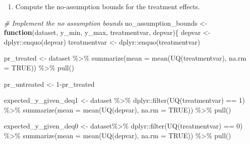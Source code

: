 \documentclass[
]{article}
\newenvironment{Shaded}{\begin{snugshade}}{\end{snugshade}}
\newcommand{\AttributeTok}[1]{\textcolor[rgb]{0.77,0.63,0.00}{#1}}
\newcommand{\CommentTok}[1]{\textcolor[rgb]{0.56,0.35,0.01}{\textit{#1}}}
\newcommand{\ConstantTok}[1]{\textcolor[rgb]{0.00,0.00,0.00}{#1}}
\newcommand{\ControlFlowTok}[1]{\textcolor[rgb]{0.13,0.29,0.53}{\textbf{#1}}}
\newcommand{\DecValTok}[1]{\textcolor[rgb]{0.00,0.00,0.81}{#1}}
\newcommand{\FunctionTok}[1]{\textcolor[rgb]{0.00,0.00,0.00}{#1}}
\newcommand{\NormalTok}[1]{#1}
\newcommand{\OtherTok}[1]{\textcolor[rgb]{0.56,0.35,0.01}{#1}}
\newcommand{\SpecialCharTok}[1]{\textcolor[rgb]{0.00,0.00,0.00}{#1}}
\providecommand{\tightlist}{%
  \setlength{\itemsep}{0pt}\setlength{\parskip}{0pt}}
\let\oldShaded\Shaded
\let\endoldShaded\endShaded
\renewenvironment{Shaded}{\footnotesize\oldShaded}{\endoldShaded}
\begin{document}
\clearpage

\begin{enumerate}
\def\labelenumi{\arabic{enumi}.}
\setcounter{enumi}{3}
\tightlist
\item
  Compute the no-assumption bounds for the treatment effects.
\end{enumerate}

\begin{Shaded}
\begin{Highlighting}[]
\CommentTok{\# Implement the no assumption bounds}
\NormalTok{no\_assumption\_bounds }\OtherTok{\textless{}{-}} \ControlFlowTok{function}\NormalTok{(dataset, y\_min, y\_max, treatmentvar, depvar)\{}
\NormalTok{  depvar }\OtherTok{\textless{}{-}}\NormalTok{ dplyr}\SpecialCharTok{::}\FunctionTok{enquo}\NormalTok{(depvar)}
\NormalTok{  treatmentvar }\OtherTok{\textless{}{-}}\NormalTok{ dplyr}\SpecialCharTok{::}\FunctionTok{enquo}\NormalTok{(treatmentvar)}
  
\NormalTok{  pr\_treated }\OtherTok{\textless{}{-}}\NormalTok{ dataset }\SpecialCharTok{\%\textgreater{}\%}
    \FunctionTok{summarize}\NormalTok{(}\AttributeTok{mean =} \FunctionTok{mean}\NormalTok{(}\FunctionTok{UQ}\NormalTok{(treatmentvar), }\AttributeTok{na.rm =} \ConstantTok{TRUE}\NormalTok{)) }\SpecialCharTok{\%\textgreater{}\%}
    \FunctionTok{pull}\NormalTok{() }
  
\NormalTok{  pr\_untreated }\OtherTok{\textless{}{-}} \DecValTok{1}\SpecialCharTok{{-}}\NormalTok{pr\_treated}
  
\NormalTok{  expected\_y\_given\_deq1 }\OtherTok{\textless{}{-}}\NormalTok{ dataset }\SpecialCharTok{\%\textgreater{}\%}
\NormalTok{    dplyr}\SpecialCharTok{::}\FunctionTok{filter}\NormalTok{(}\FunctionTok{UQ}\NormalTok{(treatmentvar) }\SpecialCharTok{==} \DecValTok{1}\NormalTok{) }\SpecialCharTok{\%\textgreater{}\%}
             \FunctionTok{summarize}\NormalTok{(}\AttributeTok{mean =} \FunctionTok{mean}\NormalTok{(}\FunctionTok{UQ}\NormalTok{(depvar), }\AttributeTok{na.rm =} \ConstantTok{TRUE}\NormalTok{)) }\SpecialCharTok{\%\textgreater{}\%}
             \FunctionTok{pull}\NormalTok{()}
  
\NormalTok{  expected\_y\_given\_deq0 }\OtherTok{\textless{}{-}}\NormalTok{ dataset}\SpecialCharTok{\%\textgreater{}\%}
\NormalTok{    dplyr}\SpecialCharTok{::}\FunctionTok{filter}\NormalTok{(}\FunctionTok{UQ}\NormalTok{(treatmentvar) }\SpecialCharTok{==} \DecValTok{0}\NormalTok{) }\SpecialCharTok{\%\textgreater{}\%}
             \FunctionTok{summarize}\NormalTok{(}\AttributeTok{mean =} \FunctionTok{mean}\NormalTok{(}\FunctionTok{UQ}\NormalTok{(depvar), }\AttributeTok{na.rm =} \ConstantTok{TRUE}\NormalTok{)) }\SpecialCharTok{\%\textgreater{}\%}
             \FunctionTok{pull}\NormalTok{()}
           

\end{Highlighting}
\end{Shaded}
\end{document}
